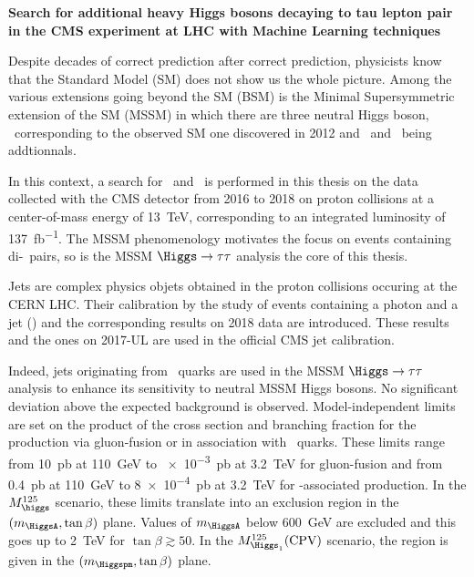 \begin{center}
\LARGE
\bf
\sffamily
Search for additional heavy Higgs bosons decaying to tau lepton pair in the CMS experiment at LHC with Machine Learning techniques
\end{center}
\bigskip

Despite decades of correct prediction after correct prediction,
physicists know that the Standard Model (SM) does not show us the whole picture.
Among the various extensions going beyond the SM (BSM)
is the
Minimal Supersymmetric extension of the SM (MSSM)
in which
there are three neutral Higgs boson,
\higgs\ corresponding to the observed SM one discovered in 2012
and
\Higgs\ and \HiggsA\ being addtionnals.
\par
In this context,
a search
for \Higgs\ and \HiggsA\ 
is performed
in this thesis
on the data collected
with the CMS detector from 2016 to 2018
on proton collisions
at a center-of-mass energy of \SI{13}{\TeV},
corresponding to an integrated luminosity of \SI{137}{\femto\barn^{-1}}.
The MSSM phenomenology motivates the focus on events containing di-\tau\ pairs,
so is the MSSM $\Higgs\to\tau\tau$ analysis the core of this thesis.
\par
Jets are complex physics objets
obtained
in the proton collisions occuring at the CERN LHC.
Their calibration by
the study of events containing a photon and a jet (\Gjet)
and the corresponding results on 2018 data
are introduced.
These results and the ones on 2017-UL
are used in the official CMS jet calibration.
\par
Indeed,
jets originating from \quarkb~quarks are used in the MSSM $\Higgs\to\tau\tau$ analysis
to enhance its sensitivity to neutral MSSM Higgs bosons.
No significant deviation above the expected background is observed.
Model-independent limits are set
on the product of the cross section and branching fraction
for the production
via gluon-fusion
or
in association with \quarkb~quarks.
These limits range
from
\SI{10}{\pico\barn} at \SI{110}{\GeV}
to
\SI{e-3}{\pico\barn} at \SI{3.2}{\TeV}
for gluon-fusion
and from
\SI{0.4}{\pico\barn} at \SI{110}{\GeV}
to
\SI{8e-4}{\pico\barn} at \SI{3.2}{\TeV}
for \quarkb-associated production.
In the $M_{\higgs}^{125}$ scenario,
these limits translate into
an exclusion region in the $(m_{\HiggsA},\tan\beta)$ plane.
Values of $m_{\HiggsA}$ below \SI{600}{\GeV} are excluded
and this goes up to 
\SI{2}{\TeV} for $\tan\beta\gtrsim\num{50}$.
In the $M_{\Higgs_1}^{125}(\text{CPV})$ scenario,
the region is given in the $(m_{\Higgspm},\tan\beta)$ plane.
